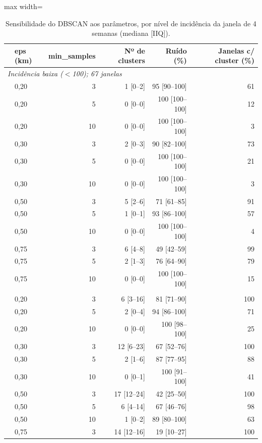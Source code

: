 \begin{table}[htbp]
\centering
\small
\caption{Sensibilidade do DBSCAN aos parâmetros, por nível de incidência da janela de 4 semanas (mediana [IIQ]).}
\label{tab:sensibilidade}
\begin{adjustbox}{max width=\linewidth}
\begin{tabular}{llrrrr}
\toprule
& eps (km) & min\_samples & Nº de clusters & Ruído (\%) & Janelas c/ cluster (\%) \\
\midrule
\multicolumn{6}{l}{\textit{Incidência baixa ($<$100); 67 janelas}} \\
 & 0,20 & 3 & 1 [0--2] & 95 [90--100] & 61 \\
 & 0,20 & 5 & 0 [0--0] & 100 [100--100] & 12 \\
 & 0,20 & 10 & 0 [0--0] & 100 [100--100] & 3 \\
 & 0,30 & 3 & 2 [0--3] & 90 [82--100] & 73 \\
 & 0,30 & 5 & 0 [0--0] & 100 [100--100] & 21 \\
 & 0,30 & 10 & 0 [0--0] & 100 [100--100] & 3 \\
 & 0,50 & 3 & 5 [2--6] & 71 [61--85] & 91 \\
 & 0,50 & 5 & 1 [0--1] & 93 [86--100] & 57 \\
 & 0,50 & 10 & 0 [0--0] & 100 [100--100] & 4 \\
 & 0,75 & 3 & 6 [4--8] & 49 [42--59] & 99 \\
 & 0,75 & 5 & 2 [1--3] & 76 [64--90] & 79 \\
 & 0,75 & 10 & 0 [0--0] & 100 [100--100] & 15 \\
\addlinespace
\multicolumn{6}{l}{\textit{Incidência média (100--400); 59 janelas}} \\
 & 0,20 & 3 & 6 [3--16] & 81 [71--90] & 100 \\
 & 0,20 & 5 & 2 [0--4] & 94 [86--100] & 71 \\
 & 0,20 & 10 & 0 [0--0] & 100 [98--100] & 25 \\
 & 0,30 & 3 & 12 [6--23] & 67 [52--76] & 100 \\
 & 0,30 & 5 & 2 [1--6] & 87 [77--95] & 88 \\
 & 0,30 & 10 & 0 [0--1] & 100 [91--100] & 41 \\
 & 0,50 & 3 & 17 [12--24] & 42 [25--50] & 100 \\
 & 0,50 & 5 & 6 [4--14] & 67 [46--76] & 98 \\
 & 0,50 & 10 & 1 [0--2] & 89 [80--100] & 63 \\
 & 0,75 & 3 & 14 [12--16] & 19 [10--27] & 100 \\

\end{tabular}
\end{adjustbox}
\end{table}
